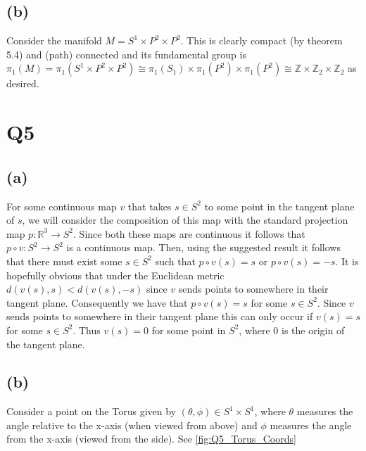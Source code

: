 \documentclass{article}
\begin{document}
\subsection*{(b)}
Consider the manifold $M = S^1 \times P^2 \times P^2$. This is clearly compact (by theorem 5.4) and (path) connected 
and its fundamental group is $\pi_1(M) = \pi_1(S^1 \times P^2 \times P^2) \cong \pi_1(S_1) \times \pi_1(P^2) \times \pi_1(P^2) \cong \mathbb{Z} \times \mathbb{Z}_2 \times \mathbb{Z}_2$ 
as desired.

\section*{Q5}
\subsection*{(a)}
For some continuous map $v$ that takes $s \in S^2$ to some point in the tangent plane of $s$, we will consider 
the composition of this map with the standard projection map $p:\mathbb{R}^3\rightarrow S^2$. 
Since both these maps are continuous it follows that $p \circ v:S^2\rightarrow S^2$ is a continuous map. 
Then, using the suggested result it follows that there must exist some $s \in S^2$ such that $p\circ v(s) = s$ 
or $p\circ v(s) = -s$. It is hopefully obvious that under the Euclidean metric $d(v(s),s) < d(v(s),-s)$ 
since $v$ sends points to somewhere in their tangent plane. Consequently we have that $p \circ v(s) = s$ 
for some $s \in S^2$. Since $v$ sends points to somewhere in their tangent plane this can only 
occur if $v(s) = s$ for some $s \in S^2$. Thus $v(s) = 0$ for some point in $S^2$, where $0$ is 
the origin of the tangent plane.

\subsection*{(b)}
Consider a point on the Torus given by $(\theta,\phi) \in S^1\times S^1$, where $\theta$ measures 
the angle relative to the x-axis (when viewed from above) and $\phi$ measures the angle 
from the x-axis (viewed from the side). See \autoref{fig:Q5_Torus_Coords}
\end{document}
